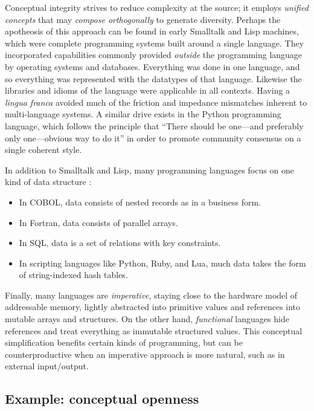 \documentclass[ twoside,openright,titlepage,numbers=noenddot,headinclude,footinclude,cleardoublepage=empty,abstract=on,
                BCOR=5mm,paper=a4,fontsize=11pt
                ]{scrreprt}
\providecommand{\tightlist}{}\newenvironment{longtable}[2]{\begin{tabular}}{\end{tabular}}
\theoremstyle{definition}
\begin{document}
Conceptual integrity strives to reduce complexity at the source; it
employs \emph{unified concepts} that may \emph{compose orthogonally} to
generate diversity. Perhaps the apotheosis of this approach can be found
in early Smalltalk and Lisp machines, which were complete programming
systems built around a single language. They incorporated capabilities
commonly provided \emph{outside} the programming language by operating
systems and databases. Everything was done in one language, and so
everything was represented with the datatypes of that language. Likewise
the libraries and idioms of the language were applicable in all
contexts. Having a \emph{lingua franca} avoided much of the friction and
impedance mismatches inherent to multi-language systems. A similar drive
exists in the Python programming language, which follows the principle
that ``There should be one---and preferably only one---obvious way to do
it'' in order to promote community consensus on a single coherent style.

In addition to Smalltalk and Lisp, many programming languages focus on
one kind of data structure \parencite{MemMod}:

\begin{itemize}
\tightlist
\item
  In COBOL, data consists of nested records as in a business form.
\item
  In Fortran, data consists of parallel arrays.
\item
  In SQL, data is a set of relations with key constraints.
\item
  In scripting languages like Python, Ruby, and Lua, much data takes the
  form of string-indexed hash tables.
\end{itemize}

Finally, many languages are \emph{imperative}, staying close to the
hardware model of addressable memory, lightly abstracted into primitive
values and references into mutable arrays and structures. On the other
hand, \emph{functional} languages hide references and treat everything
as immutable structured values. This conceptual simplification benefits
certain kinds of programming, but can be counterproductive when an
imperative approach is more natural, such as in external input/output.

\hypertarget{example-conceptual-openness}{\subsection{Example: conceptual
openness}\label{example-conceptual-openness}}
\end{document}
